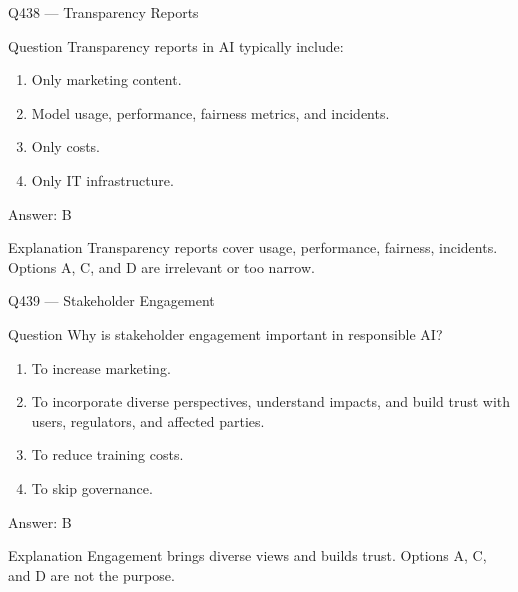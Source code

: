 \documentclass[aspectratio=169,8pt]{beamer}
\begin{document}
	\begin{frame}{Q438 --- Transparency Reports}
		\begin{block}{Question}
			Transparency reports in AI typically include:
			\begin{enumerate}
				\item Only marketing content.
				\item Model usage, performance, fairness metrics, and incidents.
				\item Only costs.
				\item Only IT infrastructure.
			\end{enumerate}
		\end{block}
		\begin{exampleblock}{Answer: B}\end{exampleblock}
		\begin{block}{Explanation}
			Transparency reports cover usage, performance, fairness, incidents. Options A, C, and D are irrelevant or too narrow.
		\end{block}
	\end{frame}
	
	\begin{frame}{Q439 --- Stakeholder Engagement}
		\begin{block}{Question}
			Why is stakeholder engagement important in responsible AI?
			\begin{enumerate}
				\item To increase marketing.
				\item To incorporate diverse perspectives, understand impacts, and build trust with users, regulators, and affected parties.
				\item To reduce training costs.
				\item To skip governance.
			\end{enumerate}
		\end{block}
		\begin{exampleblock}{Answer: B}\end{exampleblock}
		\begin{block}{Explanation}
			Engagement brings diverse views and builds trust. Options A, C, and D are not the purpose.
		\end{block}
	\end{frame}
	
\end{document}
